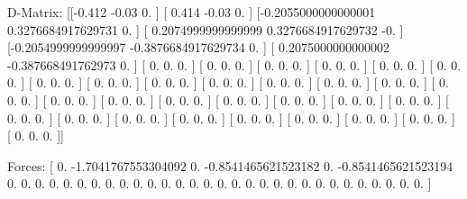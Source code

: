 D-Matrix:
[[-0.412              -0.03                0.                ]
 [ 0.414              -0.03                0.                ]
 [-0.2055000000000001  0.3276684917629731  0.                ]
 [ 0.2074999999999999  0.3276684917629732 -0.                ]
 [-0.2054999999999997 -0.3876684917629734  0.                ]
 [ 0.2075000000000002 -0.387668491762973   0.                ]
 [ 0.                  0.                  0.                ]
 [ 0.                  0.                  0.                ]
 [ 0.                  0.                  0.                ]
 [ 0.                  0.                  0.                ]
 [ 0.                  0.                  0.                ]
 [ 0.                  0.                  0.                ]
 [ 0.                  0.                  0.                ]
 [ 0.                  0.                  0.                ]
 [ 0.                  0.                  0.                ]
 [ 0.                  0.                  0.                ]
 [ 0.                  0.                  0.                ]
 [ 0.                  0.                  0.                ]
 [ 0.                  0.                  0.                ]
 [ 0.                  0.                  0.                ]
 [ 0.                  0.                  0.                ]
 [ 0.                  0.                  0.                ]
 [ 0.                  0.                  0.                ]
 [ 0.                  0.                  0.                ]
 [ 0.                  0.                  0.                ]
 [ 0.                  0.                  0.                ]
 [ 0.                  0.                  0.                ]
 [ 0.                  0.                  0.                ]
 [ 0.                  0.                  0.                ]
 [ 0.                  0.                  0.                ]
 [ 0.                  0.                  0.                ]
 [ 0.                  0.                  0.                ]
 [ 0.                  0.                  0.                ]
 [ 0.                  0.                  0.                ]
 [ 0.                  0.                  0.                ]
 [ 0.                  0.                  0.                ]]

Forces:
[ 0.                 -1.7041767553304092  0.
 -0.8541465621523182  0.                 -0.8541465621523194
  0.                  0.                  0.
  0.                  0.                  0.
  0.                  0.                  0.
  0.                  0.                  0.
  0.                  0.                  0.
  0.                  0.                  0.
  0.                  0.                  0.
  0.                  0.                  0.
  0.                  0.                  0.
  0.                  0.                  0.                ]

